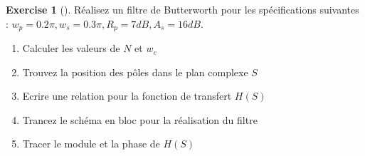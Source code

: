 \documentclass{article}
\theoremstyle{plain}%
\theoremstyle{definition}
\newtheorem{xca}[exmp]{Exercise}
\theoremstyle{remark}
\begin{document}
\begin{xca}[]
    Réalisez un filtre de Butterworth pour les spécifications suivantes : $ w_p = 0.2 \pi , w_s = 0.3 \pi , R_p = 7dB, A_s = 16 dB $. \begin{enumerate}
        \item Calculer les valeurs de $ N $ et $ w_c $ 
        \item Trouvez la position des pôles dans le plan complexe $ S $ 
        \item Ecrire une relation pour la fonction de transfert $ H(S) $ 
        \item Trancez le schéma en bloc pour la réalisation du filtre
        \item Tracer le module et la phase de $ H(S) $ 
    \end{enumerate}


\end{xca}
\end{document}
